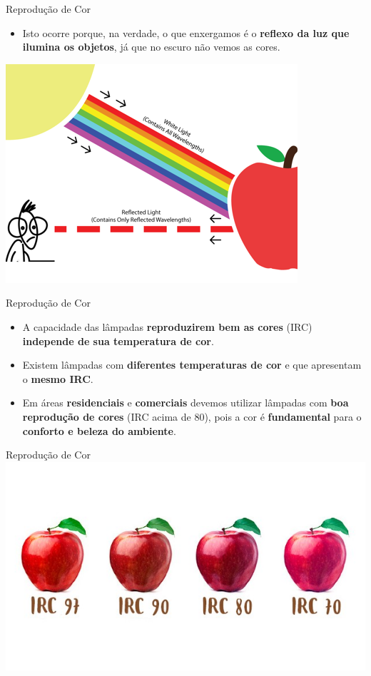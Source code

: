 \begin{frame}{Reprodução de Cor}
	\begin{block}{}
		\begin{itemize}
			\item Isto ocorre porque, na verdade, o que enxergamos é o \textbf{reflexo da luz que ilumina os objetos}, já que no escuro não vemos as cores.
		\end{itemize}
	\end{block}

	\medskip

	\centering
	\includegraphics[width=0.7\linewidth]{Figuras/Ch07/fig5.2}

\end{frame}


\begin{frame}{Reprodução de Cor}
	\begin{block}{}
		\begin{itemize}
			\item A capacidade das lâmpadas \textbf{reproduzirem bem as cores} (IRC) \textbf{independe de sua temperatura de cor}.
			\item Existem lâmpadas com \textbf{diferentes temperaturas de cor} e que apresentam o \textbf{mesmo IRC}.
			\item Em áreas \textbf{residenciais} e \textbf{comerciais} devemos utilizar lâmpadas com \textbf{boa reprodução de cores} (IRC acima de 80), pois a cor é \textbf{fundamental} para o \textbf{conforto e beleza do ambiente}.
		\end{itemize}
	\end{block}
\end{frame}


\begin{frame}{Reprodução de Cor}
	\centering
	\includegraphics[width=1\linewidth]{Figuras/Ch07/fig6}
\end{frame}


